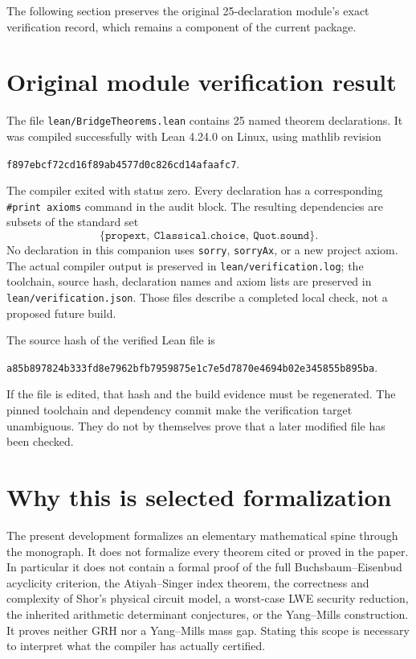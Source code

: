 The following section preserves the original 25-declaration module's exact
verification record, which remains a component of the current package.

\section{Original module verification result}

The file \texttt{lean/BridgeTheorems.lean} contains 25 named theorem
declarations. It was compiled successfully with Lean 4.24.0 on Linux, using
mathlib revision
\begin{center}\small\texttt{f897ebcf72cd16f89ab4577d0c826cd14afaafc7}.\end{center}
The compiler exited with status zero. Every declaration has a corresponding
\texttt{\#print axioms} command in the audit block. The resulting dependencies
are subsets of the standard set
\[
 \{\texttt{propext},\ \texttt{Classical.choice},\ \texttt{Quot.sound}\}.
\]
No declaration in this companion uses \texttt{sorry}, \texttt{sorryAx}, or a
new project axiom. The actual compiler output is preserved in
\texttt{lean/verification.log}; the toolchain, source hash, declaration names
and axiom lists are preserved in \texttt{lean/verification.json}. Those files
describe a completed local check, not a proposed future build.

The source hash of the verified Lean file is
\begin{center}\scriptsize
\texttt{a85b897824b333fd8e7962bfb7959875e1c7e5d7870e4694b02e345855b895ba}.
\end{center}
If the file is edited, that hash and the build evidence must be regenerated.
The pinned toolchain and dependency commit make the verification target
unambiguous. They do not by themselves prove that a later modified file has
been checked.

\section{Why this is selected formalization}

The present development formalizes an elementary mathematical spine through
the monograph. It does not formalize every theorem cited or proved in the
paper. In particular it does not contain a formal proof of the full
Buchsbaum--Eisenbud acyclicity criterion, the Atiyah--Singer index theorem,
the correctness and complexity of Shor's physical circuit model, a worst-case
LWE security reduction, the inherited arithmetic determinant conjectures, or
the Yang--Mills construction. It proves neither GRH nor a Yang--Mills mass
gap. Stating this scope is necessary to interpret what the compiler has
actually certified.

